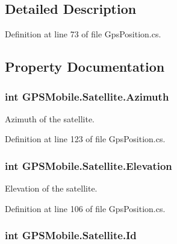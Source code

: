\subsection{Detailed Description}


Definition at line 73 of file GpsPosition.cs.

\subsection{Property Documentation}
\hypertarget{class_g_p_s_mobile_1_1_satellite_a3f2fdfad9d611ec2d7808dc489b8463b}{
\subsubsection[{Azimuth}]{\setlength{\rightskip}{0pt plus 5cm}int GPSMobile.Satellite.Azimuth}}
\label{class_g_p_s_mobile_1_1_satellite_a3f2fdfad9d611ec2d7808dc489b8463b}


Azimuth of the satellite. 

Definition at line 123 of file GpsPosition.cs.\hypertarget{class_g_p_s_mobile_1_1_satellite_aa16b85b3ccd0946443f480a2c685d5c0}{
\subsubsection[{Elevation}]{\setlength{\rightskip}{0pt plus 5cm}int GPSMobile.Satellite.Elevation}}
\label{class_g_p_s_mobile_1_1_satellite_aa16b85b3ccd0946443f480a2c685d5c0}


Elevation of the satellite. 

Definition at line 106 of file GpsPosition.cs.\hypertarget{class_g_p_s_mobile_1_1_satellite_a52f3dd8cbcb1ba2f70f6dcbd996246f2}{
\subsubsection[{Id}]{\setlength{\rightskip}{0pt plus 5cm}int GPSMobile.Satellite.Id}}
\label{class_g_p_s_mobile_1_1_satellite_a52f3dd8cbcb1ba2f70f6dcbd996246f2}


